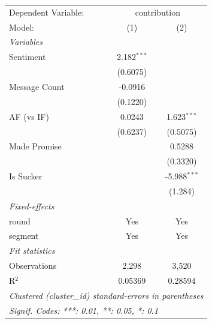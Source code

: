 
\begingroup
\centering
\begin{tabular}{lcc}
   \tabularnewline \midrule \midrule
   Dependent Variable: & \multicolumn{2}{c}{contribution}\\
   Model:        & (1)           & (2)\\  
   \midrule
   \emph{Variables}\\
   Sentiment     & 2.182$^{***}$ &   \\   
                 & (0.6075)      &   \\   
   Message Count & -0.0916       &   \\   
                 & (0.1220)      &   \\   
   AF (vs IF)    & 0.0243        & 1.623$^{***}$\\
                 & (0.6237)      & (0.5075)\\   
   Made Promise  &               & 0.5288\\   
                 &               & (0.3320)\\   
   Is Sucker     &               & -5.988$^{***}$\\   
                 &               & (1.284)\\   
   \midrule
   \emph{Fixed-effects}\\
   round         & Yes           & Yes\\  
   segment       & Yes           & Yes\\  
   \midrule
   \emph{Fit statistics}\\
   Observations  & 2,298         & 3,520\\  
   R$^2$         & 0.05369       & 0.28594\\  
   \midrule \midrule
   \multicolumn{3}{l}{\emph{Clustered (cluster\_id) standard-errors in parentheses}}\\
   \multicolumn{3}{l}{\emph{Signif. Codes: ***: 0.01, **: 0.05, *: 0.1}}\\
\end{tabular}
\par\endgroup


